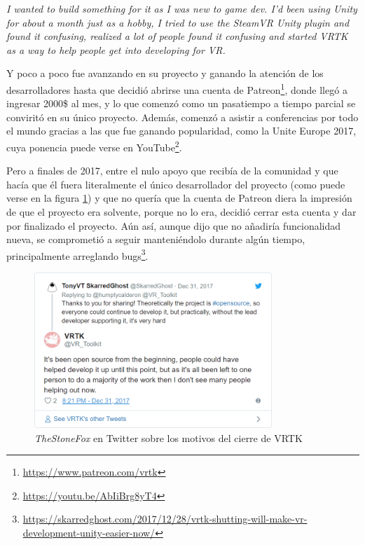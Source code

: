 \begin{displayquote}
\textit{I wanted to build something for it as I was new to game dev. I’d been using Unity for about a month just as a hobby, I tried to use the SteamVR Unity plugin and found it confusing, realized a lot of people found it confusing and started VRTK as a way to help people get into developing for VR.}
\end{displayquote}

Y poco a poco fue avanzando en su proyecto y ganando la atención de los desarrolladores hasta que decidió abrirse una cuenta de Patreon\footnote{\url{https://www.patreon.com/vrtk}}, donde llegó a ingresar 2000\$ al mes, y lo que comenzó como un pasatiempo a tiempo parcial se conviritó en su único proyecto. Además, comenzó a asistir a conferencias por todo el mundo gracias a las que fue ganando popularidad, como la Unite Europe 2017, cuya ponencia puede verse en YouTube\footnote{\url{https://youtu.be/AbIiBrg8yT4}}.

Pero a finales de 2017, entre el nulo apoyo que recibía de la comunidad y que hacía que él fuera literalmente el único desarrollador del proyecto (como puede verse en la figura \ref{fig:stonefox-twitter}) y que no quería que la cuenta de Patreon diera la impresión de que el proyecto era solvente, porque no lo era, decidió cerrar esta cuenta y dar por finalizado el proyecto. Aún así, aunque dijo que no añadiría funcionalidad nueva, se comprometió a seguir manteniéndolo durante algún tiempo, principalmente arreglando bugs\footnote{\url{https://skarredghost.com/2017/12/28/vrtk-shutting-will-make-vr-development-unity-easier-now/}}.

\begin{figure}[!h]
\begin{center}
\includegraphics[width=0.8\textwidth]{imagenes/2/stonefox-twitter.png}
\caption{\textit{TheStoneFox} en Twitter sobre los motivos del cierre de \acs{VRTK}}
\label{fig:stonefox-twitter}
\end{center}
\end{figure}

